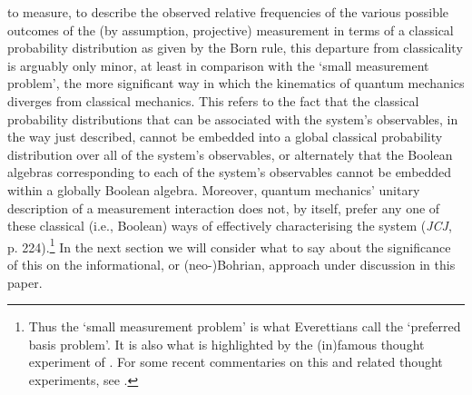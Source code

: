 \documentclass[12pt,english,twoside]{article}
\numberwithin{equation}{section}
\begin{document}
to measure, to describe the observed relative frequencies of the various possible outcomes of the (by assumption, projective) measurement in terms of a classical probability distribution as given by the Born rule, this departure from classicality is arguably only minor, at least in comparison with the `small measurement problem', the more significant way in which the kinematics of quantum mechanics diverges from classical mechanics. This refers to the fact that the classical probability distributions that can be associated with the system's observables, in the way just described, cannot be embedded into a global classical probability distribution over all of the system's observables, or alternately that the Boolean algebras corresponding to each of the system's observables cannot be embedded within a globally Boolean algebra. Moreover, quantum mechanics' unitary description of a measurement interaction does not, by itself, prefer any one of these classical (i.e., Boolean) ways of effectively characterising the system (\emph{JCJ}, p. 224).\footnote{Thus the `small measurement problem' is what Everettians call the `preferred basis problem'. It is also what is highlighted by the (in)famous thought experiment of \citet{frauchigerRenner2018}. For some recent commentaries on this and related thought experiments, see \citet[]{brukner2018, bub2017, bub2018a, bub2021, dascal2020, felline2020a}.} In the next section we will consider what to say about the significance of this on the informational, or (neo-)Bohrian, approach under discussion in this paper.




\end{document}

